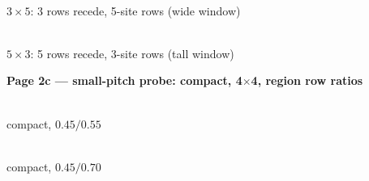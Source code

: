\documentclass{article}
\makeatletter
\newcommand{\planeratios}[2]{%
  \def\tenkz@r@planeslant{#1}\def\tenkz@r@planerise{#2}}
\makeatother
\begin{document}
\begin{minipage}[t]{10cm}\centering
  \vspace{0pt}%
  \begin{tenkzlattice}[rows=3, cols=5, frame=oblique,
                       physical=up, boundary legs]
  \end{tenkzlattice}\\[3pt]
  {\small $3\times 5$: 3 rows recede, 5-site rows (wide window)}
\end{minipage}\hfill
\begin{minipage}[t]{7cm}\centering
  \vspace{0pt}%
  \begin{tenkzlattice}[rows=5, cols=3, frame=oblique,
                       physical=up, boundary legs]
  \end{tenkzlattice}\\[3pt]
  {\small $5\times 3$: 5 rows recede, 3-site rows (tall window)}
\end{minipage}

\par\vspace{18mm}

\textbf{Page 2c --- small-pitch probe: compact, 4$\times$4, region row ratios}
\par\bigskip

\begin{minipage}[t]{7cm}\centering
  \vspace{0pt}%
  {\planeratios{0.45}{0.55}%
   \begin{tenkzlattice}[rows=4, cols=4, frame=oblique, compact,
                        physical=up, boundary legs]
   \end{tenkzlattice}}\\[3pt]
  {\small compact, $0.45/0.55$}
\end{minipage}\hfill
\begin{minipage}[t]{7cm}\centering
  \vspace{0pt}%
  {\planeratios{0.45}{0.70}%
   \begin{tenkzlattice}[rows=4, cols=4, frame=oblique, compact,
                        physical=up, boundary legs]
   \end{tenkzlattice}}\\[3pt]
  {\small compact, $0.45/0.70$}
\end{minipage}
\end{document}
